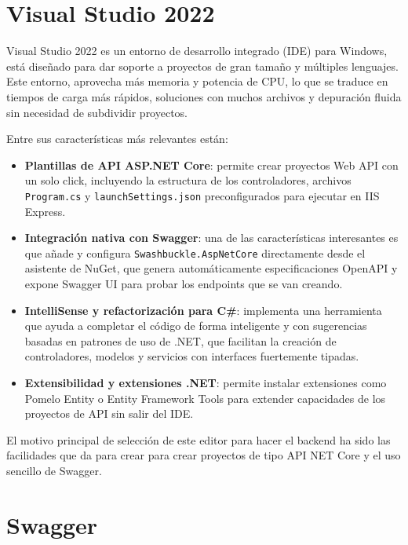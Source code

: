 \section{Visual Studio 2022}\label{visual-studio}

Visual Studio 2022 es un entorno de desarrollo integrado (IDE) para Windows, está diseñado para dar soporte a proyectos de gran tamaño y múltiples lenguajes. Este entorno, aprovecha más memoria y potencia de CPU, lo que se traduce en tiempos de carga más rápidos, soluciones con muchos archivos y depuración fluida sin necesidad de subdividir proyectos.

Entre sus características más relevantes están:
\begin{itemize}
  \item \textbf{Plantillas de API ASP.NET Core}: permite crear proyectos Web API con un solo click, incluyendo la estructura de los controladores, archivos \texttt{Program.cs} y \texttt{launchSettings.json} preconfigurados para ejecutar en IIS Express.
  \item \textbf{Integración nativa con Swagger}: una de las características interesantes es que añade y configura \texttt{Swashbuckle.AspNetCore} directamente desde el asistente de NuGet, que genera automáticamente especificaciones OpenAPI y expone Swagger UI para probar los endpoints que se van creando.
  \item \textbf{IntelliSense y refactorización para C\#}: implementa una herramienta que ayuda a completar el código de forma inteligente y con sugerencias basadas en patrones de uso de .NET, que facilitan la creación de controladores, modelos y servicios con interfaces fuertemente tipadas.
  \item \textbf{Extensibilidad y extensiones .NET}: permite instalar extensiones como Pomelo Entity o Entity Framework Tools para extender capacidades de los proyectos de API sin salir del IDE.
\end{itemize}

El motivo principal de selección de este editor para hacer el backend ha sido las facilidades que da para crear para crear proyectos de tipo API NET Core y el uso sencillo de Swagger.




\section{Swagger}\label{swagger}

